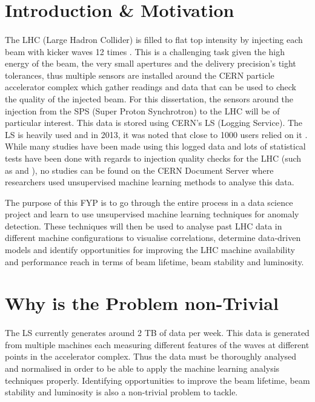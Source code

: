 \documentclass[12pt, twoside]{report}
\begin{document}
	\section{Introduction \& Motivation}	
	\paragraph{ }The LHC (Large Hadron Collider) is filled to flat top intensity by injecting each beam with kicker waves 12 times \cite{r:BeamQC}. This is a challenging task given the high energy of the beam, the very small apertures and the delivery precision's tight tolerances, thus multiple sensors are installed around the CERN particle accelerator complex \cite{r:Diagram} which gather readings and data that can be used to check the quality of the injected beam. For this dissertation, the sensors around the injection from the SPS (Super Proton Synchrotron) to the LHC will be of particular interest. This data is stored using CERN's LS (Logging Service). The LS is heavily used and in 2013, it was noted that close to 1000 users relied on it \cite{r:LS}. While many studies have been made using this logged data and lots of statistical tests have been done with regards to injection quality checks for the LHC (such as \cite{r:AutomaticIQCChecks} and \cite{r:BeamQC}), no studies can be found on the CERN Document Server \cite{r:CERNDocumentServer} where researchers used unsupervised machine learning methods to analyse this data.
	\par The purpose of this FYP is to go through the entire process in a data science project and learn to use unsupervised machine learning techniques for anomaly detection. These techniques will then be used to analyse past LHC data in different machine configurations to visualise correlations, determine data-driven models and identify opportunities for improving the LHC machine availability and performance reach in terms of beam lifetime, beam stability and luminosity.
	
	\section{Why is the Problem non-Trivial}
	
	\paragraph{ }The LS currently generates around 2 TB of data per week. This data is generated from multiple machines each measuring different features of the waves at different points in the accelerator complex. Thus the data must be thoroughly analysed and normalised in order to be able to apply the machine learning analysis techniques properly. Identifying opportunities to improve the beam lifetime, beam stability and luminosity is also a non-trivial problem to tackle.
	
\end{document}
